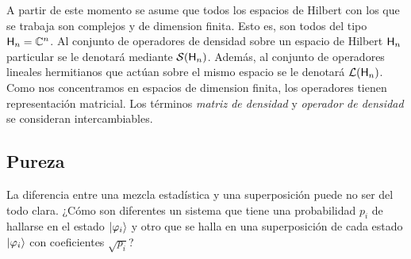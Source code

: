A partir de este momento se asume que todos los espacios de Hilbert con los que se trabaja son complejos y de dimension finita. Esto es, son todos del tipo ${\sf H}_{n}=\mathbb{C}^{n}$. Al conjunto de operadores de densidad sobre un espacio de Hilbert ${\sf H}_{n}$ particular se le denotará mediante $\mathcal{S}({\sf H}_{n})$. Además, al conjunto de operadores lineales hermitianos que actúan sobre el mismo espacio se le denotará $\mathcal{L}({\sf H}_{n})$. Como nos concentramos en espacios de dimension finita, los operadores tienen representación matricial. Los términos \textit{matriz de densidad} y \textit{operador de densidad} se consideran intercambiables. 



\subsection{Pureza}

La diferencia entre una mezcla estadística y una superposición puede no ser del todo clara. ¿Cómo son diferentes un sistema que tiene una probabilidad $p_{i}$ de hallarse en el estado $\ket{\varphi_{i}}$ y otro que se halla en una superposición de cada estado $\ket{\varphi_{i}}$ con coeficientes $\sqrt{p_{i}}$? 

